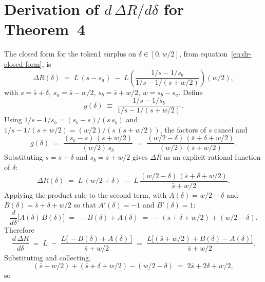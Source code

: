 \documentclass[11pt,a4paper]{article}
\theoremstyle{definition}
\begin{document}
\section[Derivation for Theorem 4]{Derivation of $d\,\Delta R/d\delta$ for Theorem~4}\label{app:dr-derivation}

The closed form for the token1 surplus on $\delta \in [0, w/2]$, from equation~\eqref{eq:dr-closed-form}, is
\begin{equation}
\Delta R(\delta) \;=\; L\,(s - s_a) \;-\; L\!\left(\frac{1/s - 1/s_b}{1/s - 1/(s + w/2)}\right)\!(w/2),
\end{equation}
with $s = \bar{s} + \delta$, $s_a = \bar{s} - w/2$, $s_b = \bar{s} + w/2$, $w = s_b - s_a$. Define
\begin{equation}
g(\delta) \;\equiv\; \frac{1/s - 1/s_b}{1/s - 1/(s + w/2)}.
\end{equation}
Using $1/s - 1/s_b = (s_b - s)/(s\,s_b)$ and $1/s - 1/(s + w/2) = (w/2)/(s\,(s + w/2))$, the factors of $s$ cancel and
\begin{equation}\label{eq:g-simplified}
g(\delta) \;=\; \frac{(s_b - s)\,(s + w/2)}{(w/2)\,s_b} \;=\; \frac{(w/2 - \delta)\,(\bar{s} + \delta + w/2)}{(w/2)\,(\bar{s} + w/2)}.
\end{equation}
Substituting $s = \bar{s} + \delta$ and $s_b = \bar{s} + w/2$ gives $\Delta R$ as an explicit rational function of $\delta$:
\begin{equation}
\Delta R(\delta) \;=\; L\,(w/2 + \delta) \;-\; L\,\frac{(w/2 - \delta)\,(\bar{s} + \delta + w/2)}{\bar{s} + w/2}.
\end{equation}
Applying the product rule to the second term, with $A(\delta) = w/2 - \delta$ and $B(\delta) = \bar{s} + \delta + w/2$ so that $A'(\delta) = -1$ and $B'(\delta) = 1$:
\begin{equation}
\frac{d}{d\delta}\bigl[A(\delta)\,B(\delta)\bigr] \;=\; -B(\delta) + A(\delta) \;=\; -(\bar{s} + \delta + w/2) + (w/2 - \delta).
\end{equation}
Therefore
\begin{equation}
\frac{d\,\Delta R}{d\delta} \;=\; L \;-\; \frac{L\bigl[\,-B(\delta) + A(\delta)\,\bigr]}{\bar{s} + w/2} \;=\; \frac{L\bigl[(\bar{s} + w/2) + B(\delta) - A(\delta)\bigr]}{\bar{s} + w/2}.
\end{equation}
Substituting and collecting,
\begin{equation}
(\bar{s} + w/2) + (\bar{s} + \delta + w/2) - (w/2 - \delta) \;=\; 2\bar{s} + 2\delta + w/2,
\end{equation}
so
\end{document}
